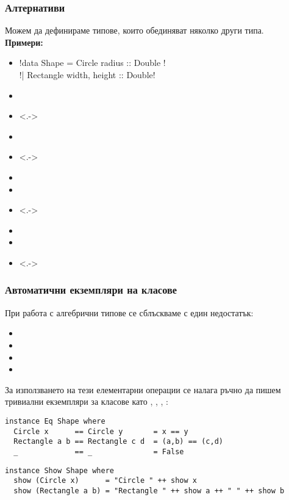\documentclass[alsotrans]{beamerswitch}
\begin{document}
\begin{frame}[fragile]
  \frametitle{Алтернативи}
  Можем да дефинираме типове, които обединяват няколко други типа.\\
  \pause
  \textbf{Примери:}
  \begin{itemize}[<+->]
  \item \lst!data Shape = Circle { radius :: Double } !\\
    \hspace{4em}\lst!| Rectangle { width, height :: Double}!
  \item {}
  \item<.-> 
  \item {}
  \item<.-> 
  \item {}
  \item {}
  \item<.-> 
  \item {}
  \item {}
  \item<.-> 
  \end{itemize}
\end{frame}

\begin{frame}[fragile]
  \frametitle{Автоматични екземпляри на класове}

  При работа с алгебрични типове се сблъскваме с един недостатък:\pause
  \begin{itemize}[<+->]
  \item {}
  \item {}
  \item {}
  \item {}
  \end{itemize}
  \onslide<+->
  За използването на тези елементарни операции се налага ръчно да пишем тривиални екземпляри за класове като , , , :
  \onslide<+->
  \small
\begin{lstlisting}
instance Eq Shape where
  Circle x      == Circle y       = x == y
  Rectangle a b == Rectangle c d  = (a,b) == (c,d)
  _             == _              = False
\end{lstlisting}
  \onslide<+->
\begin{lstlisting}
instance Show Shape where
  show (Circle x)      = "Circle " ++ show x
  show (Rectangle a b) = "Rectangle " ++ show a ++ " " ++ show b
\end{lstlisting}
\end{frame}
\end{document}
